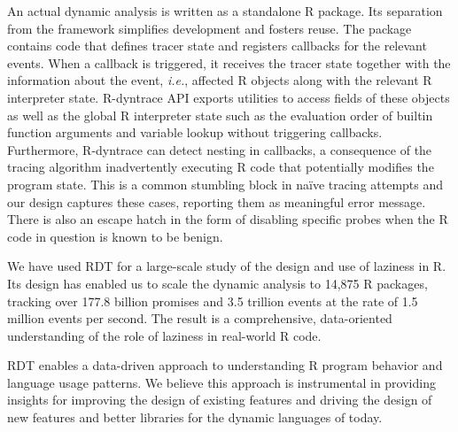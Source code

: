 \documentclass[acmsmall,review]{acmart}
\newcommand{\Ie}{\emph{i.e.}\xspace}
\newcommand{\RDT}{RDT\xspace}
\newcommand{\RDyntrace}{R-dyntrace\xspace}
\begin{document}
\indent An actual dynamic analysis is written as a standalone R package. Its
separation from the framework simplifies development and fosters reuse. The
package contains code that defines tracer state and registers callbacks for the
relevant events. When a callback is triggered, it receives the tracer state
together with the information about the event, \Ie, affected R objects along
with the relevant R interpreter state. \RDyntrace API exports utilities to access
fields of these objects as well as the global R interpreter state such as the
evaluation order of builtin function arguments and variable lookup without
triggering callbacks. Furthermore, \RDyntrace can detect nesting in callbacks,
a consequence of the tracing algorithm inadvertently executing R code that
potentially modifies the program state. This is a common stumbling block in
na\"ive tracing attempts and our design captures these cases, reporting them as
meaningful error message. There is also an escape hatch in the form of disabling
specific probes when the R code in question is known to be benign.

We have used \RDT for a large-scale study of the design and use of laziness in
R. Its design has enabled us to scale the dynamic analysis to 14,875 R packages,
tracking over 177.8 billion promises and 3.5 trillion events at the rate of 1.5
million events per second. The result is a comprehensive, data-oriented
understanding of the role of laziness in real-world R code.

\RDT enables a data-driven approach to understanding R program behavior and
language usage patterns. We believe this approach is instrumental in providing
insights for improving the design of existing features and driving the design of
new features and better libraries for the dynamic languages of today.
\end{document}
